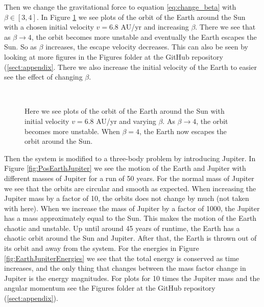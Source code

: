 \documentclass[12pt,a4paper,english]{article}
\begin{document}
Then we change the gravitational force to equation \ref{eq:change_beta} with $\beta\in[3,4]$. In Figure \ref{fig:beta_change} we see plots of the orbit of the Earth around the Sun with a chosen initial velocity $v=6.8$ AU/yr and increasing $\beta$. There we see that as $\beta\rightarrow4$, the orbit becomes more unstable and eventually the Earth escapes the Sun. So as $\beta$ increases, the escape velocity decreases. This can also be seen by looking at more figures in the Figures folder at the GitHub repository (\ref{sect:appendix}. There we also increase the initial velocity of the Earth to easier see the effect of changing $\beta$.

\begin{figure}[htbp]
	\hspace{0.5em}
	\\
	\hspace{0.5em}
	\caption{Here we see plots of the orbit of the Earth around the Sun with initial velocity $v=6.8$ AU/yr and varying $\beta$. As $\beta\rightarrow4$, the orbit becomes more unstable. When $\beta=4$, the Earth now escapes the orbit around the Sun. \label{fig:beta_change}}
\end{figure}

Then the system is modified to a three-body problem by introducing Jupiter. In Figure \ref{fig:PosEarthJupiter} we see the motion of the Earth and Jupiter with different masses of Jupiter for a run of 50 years. For the normal mass of Jupiter we see that the orbits are circular and smooth as expected. When increasing the Jupiter mass by a factor of 10, the orbits does not change by much (not taken with here). When we increase the mass of Jupiter by a factor of 1000, the Jupiter has a mass approximately equal to the Sun. This makes the motion of the Earth chaotic and unstable. Up until around 45 years of runtime, the Earth has a chaotic orbit around the Sun and Jupiter. After that, the Earth is thrown out of its orbit and away from the system. For the energies in Figure \ref{fig:EarthJupiterEnergies} we see that the total energy is conserved as time increases, and the only thing that changes between the mass factor change in Jupiter is the energy magnitudes. For plots for 10 times the Jupiter mass and the angular momentum see the Figures folder at the GitHub repository (\ref{sect:appendix}).
\end{document}
